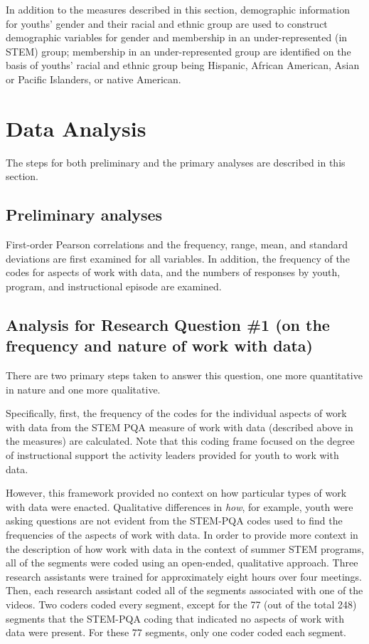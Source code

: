 \documentclass[]{msu-thesis}
\theoremstyle{definition}
\theoremstyle{definition}
\theoremstyle{definition}
\theoremstyle{remark}
\begin{document}
In addition to the measures described in this section, demographic
information for youths' gender and their racial and ethnic group are
used to construct demographic variables for gender and membership in an
under-represented (in STEM) group; membership in an under-represented
group are identified on the basis of youths' racial and ethnic group
being Hispanic, African American, Asian or Pacific Islanders, or native
American.

\section{Data Analysis}\label{data-analysis}

The steps for both preliminary and the primary analyses are described in
this section.

\subsection{Preliminary analyses}\label{preliminary-analyses}

First-order Pearson correlations and the frequency, range, mean, and
standard deviations are first examined for all variables. In addition,
the frequency of the codes for aspects of work with data, and the
numbers of responses by youth, program, and instructional episode are
examined.

\subsection{Analysis for Research Question \#1 (on the frequency and
nature of work with
data)}\label{analysis-for-research-question-1-on-the-frequency-and-nature-of-work-with-data}

There are two primary steps taken to answer this question, one more
quantitative in nature and one more qualitative.

Specifically, first, the frequency of the codes for the individual
aspects of work with data from the STEM PQA measure of work with data
(described above in the measures) are calculated. Note that this coding
frame focused on the degree of instructional support the activity
leaders provided for youth to work with data.

However, this framework provided no context on how particular types of
work with data were enacted. Qualitative differences in \emph{how}, for
example, youth were asking questions are not evident from the STEM-PQA
codes used to find the frequencies of the aspects of work with data. In
order to provide more context in the description of how work with data
in the context of summer STEM programs, all of the segments were coded
using an open-ended, qualitative approach. Three research assistants
were trained for approximately eight hours over four meetings. Then,
each research assistant coded all of the segments associated with one of
the videos. Two coders coded every segment, except for the 77 (out of
the total 248) segments that the STEM-PQA coding that indicated no
aspects of work with data were present. For these 77 segments, only one
coder coded each segment.
\end{document}
